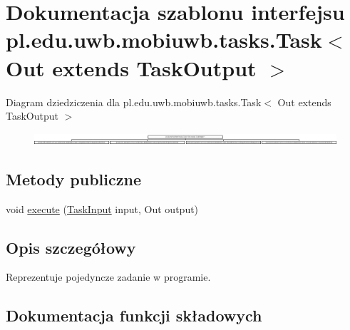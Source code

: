 \hypertarget{interfacepl_1_1edu_1_1uwb_1_1mobiuwb_1_1tasks_1_1_task}{}\section{Dokumentacja szablonu interfejsu pl.\+edu.\+uwb.\+mobiuwb.\+tasks.\+Task$<$ Out extends Task\+Output $>$}
\label{interfacepl_1_1edu_1_1uwb_1_1mobiuwb_1_1tasks_1_1_task}
Diagram dziedziczenia dla pl.\+edu.\+uwb.\+mobiuwb.\+tasks.\+Task$<$ Out extends Task\+Output $>$\begin{figure}[H]
\begin{center}
\leavevmode
\includegraphics[height=0.424886cm]{interfacepl_1_1edu_1_1uwb_1_1mobiuwb_1_1tasks_1_1_task}
\end{center}
\end{figure}
\subsection*{Metody publiczne}
\begin{DoxyCompactItemize}
\item 
void \hyperlink{interfacepl_1_1edu_1_1uwb_1_1mobiuwb_1_1tasks_1_1_task_a99720fa29e8a9edcfbf5267d0695678a}{execute} (\hyperlink{classpl_1_1edu_1_1uwb_1_1mobiuwb_1_1tasks_1_1models_1_1_task_input}{Task\+Input} input, Out output)
\end{DoxyCompactItemize}


\subsection{Opis szczegółowy}
Reprezentuje pojedyncze zadanie w programie. 

\subsection{Dokumentacja funkcji składowych}
\hypertarget{interfacepl_1_1edu_1_1uwb_1_1mobiuwb_1_1tasks_1_1_task_a99720fa29e8a9edcfbf5267d0695678a}{}
